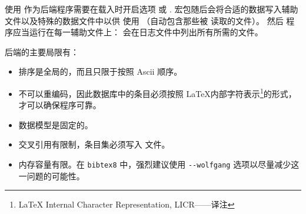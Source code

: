 使用 \BibTeX 作为后端程序需要在载入时开启选项  或 .
\biblatex 宏包随后会将合适的数据写入辅助文件以及特殊的数据文件中以供 \BibTeX 使用
（自动包含那些被 \BibTeX 读取的文件）。
然后  程序应当运行在每一辅助文件上：
\biblatex 会在日志文件中列出所有所需的文件。

\BibTeX 后端的主要局限有：

\begin{itemize}

\item %
排序是全局的，而且只限于按照 Ascii 顺序。


\item %
不可以重编码，因此数据库中的条目必须按照 \LaTeX 内部字符表示\footnote{\LaTeX{} Internal Character Representation, LICR——译注}的形式，才可以确保程序可靠。

\item %
数据模型是固定的。

\item %
交叉引用有限制，条目集必须写入  文件。
\item %
内存容量有限。在 \verb|bibtex8| 中，强烈建议使用 \verb|--wolfgang| 选项以尽量减少这一问题的可能性。

\end{itemize}

\endinput
